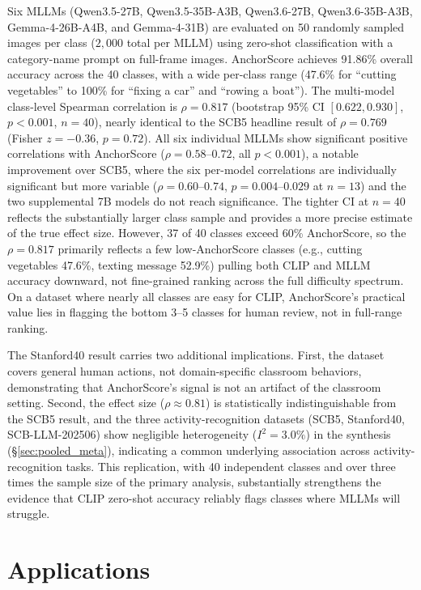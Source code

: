 \documentclass[a4paper,fleqn]{cas-sc}
\begin{document}
Six MLLMs (Qwen3.5-27B, Qwen3.5-35B-A3B, Qwen3.6-27B, Qwen3.6-35B-A3B, Gemma-4-26B-A4B, and Gemma-4-31B) are evaluated on 50 randomly sampled images per class ($2{,}000$ total per MLLM) using zero-shot classification with a category-name prompt on full-frame images. AnchorScore achieves 91.86\% overall accuracy across the 40 classes, with a wide per-class range (47.6\% for ``cutting vegetables'' to 100\% for ``fixing a car'' and ``rowing a boat''). The multi-model class-level Spearman correlation is $\rho=0.817$ (bootstrap 95\% CI $[0.622, 0.930]$, $p<0.001$, $n=40$), nearly identical to the SCB5 headline result of $\rho=0.769$ (Fisher $z=-0.36$, $p=0.72$). All six individual MLLMs show significant positive correlations with AnchorScore ($\rho=0.58$--$0.72$, all $p<0.001$), a notable improvement over SCB5, where the six per-model correlations are individually significant but more variable ($\rho=0.60$--$0.74$, $p=0.004$--$0.029$ at $n=13$) and the two supplemental 7B models do not reach significance. The tighter CI at $n=40$ reflects the substantially larger class sample and provides a more precise estimate of the true effect size. However, 37 of 40 classes exceed 60\% AnchorScore, so the $\rho=0.817$ primarily reflects a few low-AnchorScore classes (e.g., cutting vegetables 47.6\%, texting message 52.9\%) pulling both CLIP and MLLM accuracy downward, not fine-grained ranking across the full difficulty spectrum. On a dataset where nearly all classes are easy for CLIP, AnchorScore's practical value lies in flagging the bottom 3--5 classes for human review, not in full-range ranking.

The Stanford40 result carries two additional implications. First, the dataset covers general human actions, not domain-specific classroom behaviors, demonstrating that AnchorScore's signal is not an artifact of the classroom setting. Second, the effect size ($\rho\approx0.81$) is statistically indistinguishable from the SCB5 result, and the three activity-recognition datasets (SCB5, Stanford40, SCB-LLM-202506) show negligible heterogeneity ($I^2=3.0\%$) in the synthesis (\S\ref{sec:pooled_meta}), indicating a common underlying association across activity-recognition tasks. This replication, with 40 independent classes and over three times the sample size of the primary analysis, substantially strengthens the evidence that CLIP zero-shot accuracy reliably flags classes where MLLMs will struggle.

\section{Applications}
\label{sec:applications}
\end{document}
